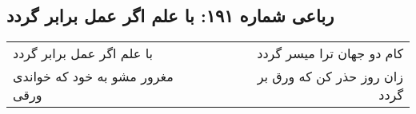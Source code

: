 \begin{center}
\section*{رباعی شماره ۱۹۱: با علم اگر عمل برابر گردد}
\label{sec:sh191}
\begin{longtable}{l p{0.5cm} r}
با علم اگر عمل برابر گردد
&&
کام دو جهان ترا میسر گردد
\\
مغرور مشو به خود که خواندی ورقی
&&
زان روز حذر کن که ورق بر گردد
\\
\end{longtable}
\end{center}
